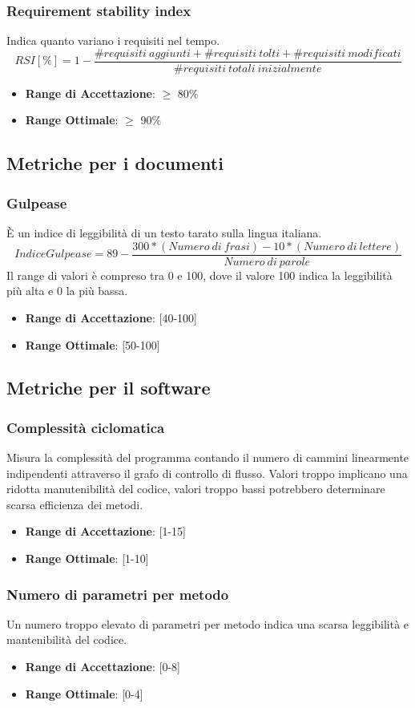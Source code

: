 \documentclass[12pt,a4paper]{article}
\begin{document}
\subsubsection{Requirement stability index}
Indica quanto variano i requisiti nel tempo.
\[RSI[\%]= 1 - \frac{\#requisiti\ aggiunti+\#requisiti\ tolti+\#requisiti\ modificati}{\#requisiti\ totali\ inizialmente}\]
\begin{itemize}
	\item \textbf{Range di Accettazione}: $\geq$ 80\%
	\item \textbf{Range Ottimale}: $\geq$ 90\%
\end{itemize}
\subsection{Metriche per i documenti}\label{metriche_doc}
\subsubsection{Gulpease}
È un indice di leggibilità di un testo tarato sulla lingua italiana.
\[IndiceGulpease=89-\frac{300*(Numero\ di\ frasi)-10*(Numero\ di\ lettere)}{Numero\ di\ parole}\]
Il range di valori è compreso tra 0 e 100, dove il valore 100 indica la leggibilità più alta e 0 la più bassa.
\begin{itemize}
\item \textbf{Range di Accettazione}: [40-100]
\item \textbf{Range Ottimale}: [50-100]
\end{itemize}
\subsection{ Metriche per il software}\label{metriche_sw}
\subsubsection{Complessità ciclomatica}
Misura la complessità del programma contando il numero di cammini linearmente indipendenti attraverso il grafo di controllo di flusso. Valori troppo implicano una ridotta manutenibilità del codice, valori troppo bassi potrebbero determinare scarsa efficienza dei metodi.
\begin{itemize}
\item \textbf{Range di Accettazione}: [1-15]
\item \textbf{Range Ottimale}: [1-10]
\end{itemize}
\subsubsection{Numero di parametri per metodo}
Un numero troppo elevato di parametri per metodo indica una scarsa leggibilità e mantenibilità del codice.
\begin{itemize}
\item \textbf{Range di Accettazione}: [0-8]
\item \textbf{Range Ottimale}: [0-4]
\end{itemize}
\end{document}
